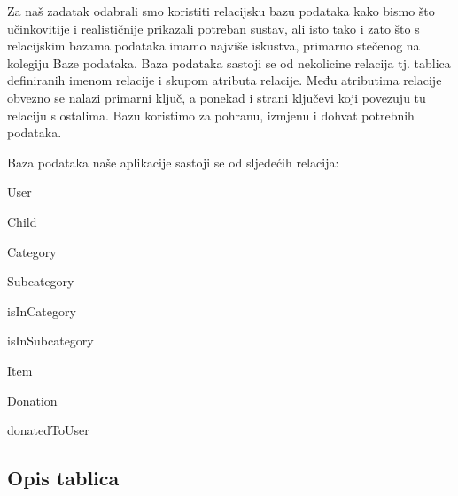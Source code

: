 		Za naš zadatak odabrali smo koristiti relacijsku bazu podataka kako bismo što učinkovitije i realističnije prikazali potreban sustav, 
		ali isto tako i zato što s relacijskim bazama podataka imamo najviše iskustva, primarno stečenog na kolegiju Baze podataka.
		Baza podataka sastoji se od nekolicine relacija tj. tablica definiranih imenom relacije i skupom atributa relacije.
		Među atributima relacije obvezno se nalazi primarni ključ, a ponekad i strani ključevi koji povezuju tu relaciju s ostalima.
		Bazu koristimo za pohranu, izmjenu i dohvat potrebnih podataka.

		\vspace{15pt}

		Baza podataka naše aplikacije sastoji se od sljedećih relacija:
		\begin{packed_item}
			\item User
			\item Child
			\item Category
			\item Subcategory
			\item isInCategory
			\item isInSubcategory
			\item Item
			\item Donation
			\item donatedToUser
		\end{packed_item}
			
			\eject
			\subsection{Opis tablica}
			

